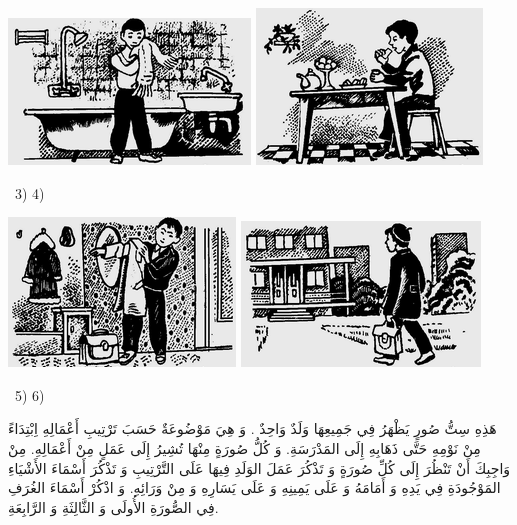 \documentclass[a5paper]{article}
\begin{document}
 \includegraphics[width=2.5311in,height=1.5311in]{images/MuhammadBagauddinprettified-img341.png}   \includegraphics[width=2.3646in,height=1.6354in]{images/MuhammadBagauddinprettified-img342.png} 

\ 3) 4)

 \includegraphics[width=2.3752in,height=1.5626in]{images/MuhammadBagauddinprettified-img343.png}   \includegraphics[width=2.5in,height=1.5209in]{images/MuhammadBagauddinprettified-img344.png} 

\ 5) 6)

هَذِهِ سِتُّ صُورٍ يَظْهَرُ فِي جَمِيعِهَا وَلَدٌ وَاحِدٌ . وَ هِيَ مَوْضُوعَةٌ حَسَبَ تَرْتِيبِ أَعْمَالِهِ اِبْتِدَاءً مِنْ نَوْمِهِ حَتَّى ذَهَابِهِ إِلَى المَدْرَسَةِ. وَ كُلُّ صُورَةٍ مِنْهَا تُشِيرُ إِلَى عَمَلٍ مِنْ أَعْمَالِهِ. مِنْ وَاجِبِكَ أَنْ تَنْظُرَ إِلَى كُلِّ صُورَةٍ وَ تَذْكُرَ عَمَلَ الوَلَدِ فِيهَا عَلَى التَّرْتِيبِ وَ تَذْكُرَ أَسْمَاءَ الأَشْيَاءِ المَوْجُودَةِ فِي يَدِهِ وَ أَمَامَهُ وَ عَلَى يَمِينِهِ وَ عَلَى يَسَارِهِ وَ مِنْ وَرَائِهِ. وَ اذْكُرْ أَسْمَاءَ الغُرَفِ فِي الصُّورَةِ الأُولَى وَ الثَّالِثَةِ وَ الرَّابِعَةِ.
\end{document}
